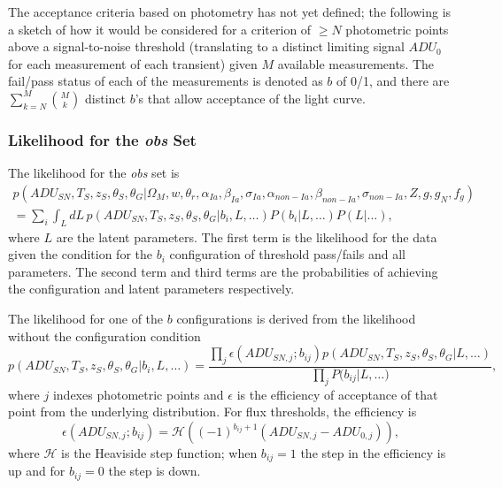 \documentclass[preprint,3p]{elsarticle}
\begin{document}
The acceptance criteria based on photometry has not yet defined; the following is a sketch
of how it would be considered for a criterion of $\ge N$ photometric points
above a signal-to-noise threshold (translating to a distinct limiting signal $ADU_0$
for each measurement of each transient) given $M$ available measurements. 
The fail/pass status of each of the measurements is denoted as
$b$ of 0/1, and there are $\sum_{k=N}^M \binom{M}{k}$ 
distinct $b$'s that allow acceptance of the light curve.




\subsubsection{Likelihood for the {\it obs} Set}
The likelihood for the {\it obs} set is
\begin{multline}
p(\mathit{ADU}_{SN}, {{T}}_S,{{z}}_S, \theta_{S}, \theta_G |  \Omega_M, w, \theta_r, \alpha_{Ia}, \beta_{Ia},\sigma_{Ia}, \alpha_{\mathit{non-Ia}},\beta_{\mathit{non-Ia}}, \sigma_{\mathit{non-Ia}},  Z, g, g_N, f_g)\\
= \sum_i \int_L dL\, p(\mathit{ADU}_{SN}, {{T}}_S,{{z}}_S, \theta_{S}, \theta_G | b_i, L, \ldots)
P(b_{i} |L, \ldots) P(L|\ldots) ,
\end{multline} 
where $L$ are the latent parameters.
The first term is the likelihood for the data given the condition for the  $b_i$ configuration
of threshold pass/fails  and all parameters.  The second term and
third terms are the probabilities of achieving the configuration
and latent parameters
respectively.

The likelihood for one of the $b$ configurations is derived from the likelihood without the configuration condition
\begin{equation}
p(\mathit{ADU}_{SN}, {{T}}_S,{{z}}_S, \theta_{S}, \theta_G | b_i, L, \ldots)
  =  \frac{ \prod_j
 \epsilon(\mathit{ADU}_{SN,j}; b_{ij})
  p(\mathit{ADU}_{SN}, {{T}}_S,{{z}}_S, \theta_{S}, \theta_G | L, \ldots)}
  {\prod_j P(b_{ij}{ |L,\dots)}} ,
\label{obsconf:eqn}
\end{equation}
where $j$ indexes photometric points and
$\epsilon$ is the efficiency of acceptance of that point from the underlying distribution.
For flux thresholds, the efficiency is
\begin{equation}
\epsilon(\mathit{ADU}_{SN,j}; b_{ij})= \mathcal{H}\left((-1)^{b_{ij}+1}(ADU_{SN,j}-ADU_{0,j})\right),
\end{equation}
where $\mathcal{H}$ is the Heaviside step function; when $b_{ij}=1$ the step in the efficiency
is up and for $b_{ij}=0$ the step is down.
\end{document}
